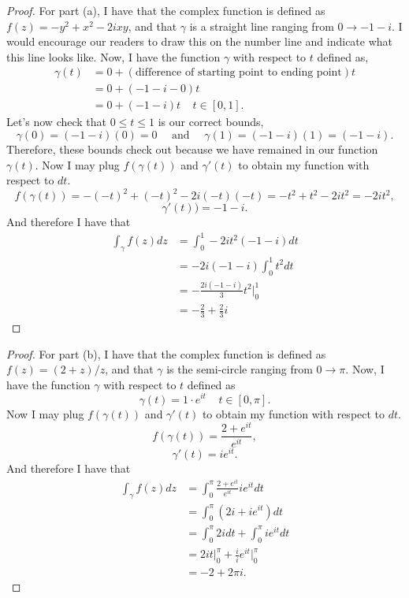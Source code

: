 \documentclass[10pt,two side,openright]{article}
\newcommand{\8}{\bar}
\newcommand{\f}{\frac}
\begin{document}
\begin{proof}
For part (a), I have that the complex function is defined as \newline $f(z) = -y^{2} +x^{2} -2ixy$, and that $\gamma$ is a straight line ranging from $0 \to -1-i$. I would encourage our readers to draw this on the number line and indicate what this line looks like. Now, I have the function $\gamma$ with respect to $t$ defined as,
\begin{align*}
\gamma(t) &= 0 + (\text{difference of starting point to ending point})t \\
                 &= 0 + ( -1 -i -0)t \\
                 &= 0 + ( -1 -i)t \ \ \ \ \ t \in [0,1]. 
\end{align*}
Let's now check that $0 \leq t \leq 1$ is our correct bounds,
\[ \gamma(0) = (-1 -i)(0) = 0 \ \ \ \ \ \ \text{and} \ \ \ \ \ \ \gamma(1) = (-1-i)(1) = (-1-i).\] 
Therefore, these bounds check out because we have remained in our function $\gamma(t).$ Now I may plug $f(\gamma(t))$ and $\gamma'(t)$ to obtain my function with respect to $dt.$
\[f(\gamma(t)) = -(-t)^{2} + (-t)^{2} - 2i(-t)(-t) = -t^{2} + t^{2} -2it^{2} = -2it^{2}, \] 
\[\gamma'(t)) = -1 -i.\] 
And therefore I have that 
\begin{align*} 
\int_{\gamma}f(z)dz &= \int_{0}^{1}-2it^{2}(-1-i) dt \\
			       &= -2i(-1-i)\int_{0}^{1} t^{2} dt \\
			       &= -\f{2i(-1-i)}{3}t^{2}\Big|_{0}^{1} \\
			       &=  -\f{2}{3} +\f{2}{3}i 
\end{align*}
\end{proof}


\begin{proof}
For part (b), I have that the complex function is defined as \newline $f(z) = (2+z)/z$, and that $\gamma$ is the semi-circle ranging from $0 \to \pi$. Now, I have the function $\gamma$ with respect to $t$ defined as
\[\gamma(t) = 1\cdot e^{it} \ \ \ \ \ t \in [0, \pi]. \]
Now I may plug $f(\gamma(t))$ and $\gamma'(t)$ to obtain my function with respect to $dt.$
\[f(\gamma(t)) = \f{2+e^{it}}{e^{it}},\] 
\[ \gamma '(t) = ie^{it}. \] 
And therefore I have that 
\begin{align*} 
\int_{\gamma}f(z)dz &= \int_{0}^{\pi} \f{2+e^{it}}{e^{it}}ie^{it} dt \\
			       &= \int_{0}^{\pi} (2i +ie^{it}) dt \\
			       &= \int_{0}^{\pi} 2i dt + \int_{0}^{\pi} ie^{it} dt \\
			       &= 2it\Big|_{0}^{\pi} + \f{i}{i}e^{it}\Big|_{0}^{\pi} \\
			       &= -2 + 2\pi i.
\end{align*}

\end{proof}
\end{document}
